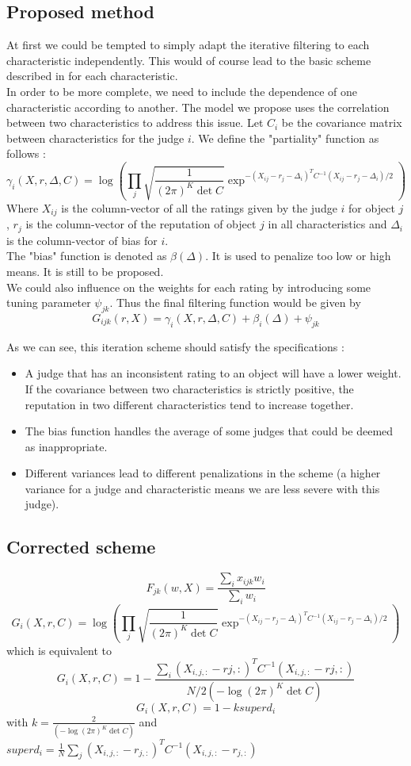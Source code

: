 \subsection*{Proposed method}
At first we could be tempted to simply adapt the iterative filtering to each characteristic independently. This would of course lead to the basic scheme described in \cite{Cristo1} for each characteristic.\\
In order to be more complete, we need to include the dependence of one characteristic according to another.
The model we propose uses the correlation between two characteristics to address this issue.
Let $C_i$ be the covariance matrix between characteristics for the judge $i$.
We define the "partiality" function as follows :
$$\gamma_{i}(X,r,\Delta,C) = \log (\prod_j \sqrt{\frac{1}{(2\pi)^{K}\det C}} \exp^{- (X_{ij}-r_j-\Delta_i)^TC^{-1} (X_{ij}-r_j-\Delta_i)/2})$$
Where $X_{ij}$ is the column-vector of all the ratings given by the judge $i$ for object $j$, $r_j$ is the column-vector of the reputation of object $j$ in all characteristics and $\Delta_i$ is the column-vector of bias for $i$.\\
The "bias" function is denoted as $\beta(\Delta)$. It is used to penalize too low or high means. It is still to be proposed.\\
We could also influence on the weights for each rating by introducing some tuning parameter $\psi_{jk}$.
Thus the final filtering function would be given by 
$$G_{ijk}(r,X) = \gamma_{i}(X,r,\Delta,C) + \beta_i(\Delta)+\psi_{jk}$$

As we can see, this iteration scheme should satisfy the specifications : 
\begin{itemize}
\item A judge that has an inconsistent rating to an object will have a lower weight. If the covariance between two characteristics is strictly positive, the reputation in two different characteristics tend to increase together.
\item The bias function handles the average of some judges that could be deemed as inappropriate.
\item Different variances lead to different penalizations in the scheme (a higher variance for a judge and characteristic means we are less severe with this judge).
\end{itemize}

\subsection*{Corrected scheme}
$$F_{jk}(w,X) = \frac{\sum_{i}x_{ijk}w_{i}}{\sum_i w_{i}}$$
$$G_{i}(X,r,C) = \log (\prod_j \sqrt{\frac{1}{(2\pi)^{K}\det C}} \exp^{- (X_{ij}-r_j-\Delta_i)^TC^{-1} (X_{ij}-r_j-\Delta_i)/2})$$
which is equivalent to
$$G_{i}(X,r,C) = 1 - \frac{\sum_i (X_{i,j,:}-r{j,:})^TC^{-1}(X_{i,j,:}-r{j,:})}{N/2(-\log(2\pi )^K \det C)}$$
$$G_{i}(X,r,C) = 1 -k superd_i$$
with $k= \frac{2}{(-\log(2\pi )^K \det C)}$ and $superd_i =  \frac{1}{N}\sum_{j} (X_{i,j,:}-r_{j,:})^T C^{-1} (X_{i,j,:}-r_{j,:})$


